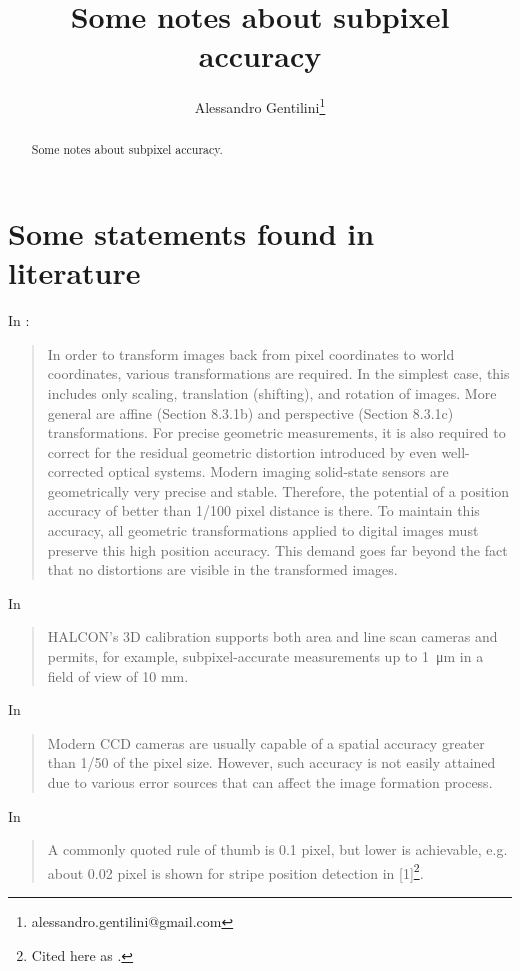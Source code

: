 \documentclass[a4paper,12pt]{article}
\title{Some notes about subpixel accuracy}
\author{Alessandro Gentilini\thanks{alessandro.gentilini@gmail.com}}
\begin{document}
\maketitle

\begin{abstract}
Some notes about subpixel accuracy.
\end{abstract} 

\section{Some statements found in literature}
In \cite[section 8.2, p.270]{Jahne:2004:PHI:983100}:
\begin{quotation}
In order to transform images back from pixel coordinates to world coordinates,
various transformations are required. In the simplest case, this
includes only scaling,
translation (shifting), and rotation of images. More general are
affine (Section 8.3.1b)
and perspective (Section 8.3.1c) transformations. For precise
geometric measurements,
it is also required to correct for the residual geometric distortion
introduced by even
well-corrected optical systems. Modern imaging solid-state sensors are
geometrically
very precise and stable. Therefore, the potential of a position
accuracy of better than
1/100 pixel distance is there. To maintain this accuracy, all
geometric transformations
applied to digital images must preserve this high position accuracy.
This demand goes
far beyond the fact that no distortions are visible in the transformed images.
\end{quotation}

In \cite{halcon}
\begin{quotation}
HALCON’s 3D calibration supports both area and line scan cameras and
permits, for example, subpixel-accurate measurements up to \SI{1}{\micro\metre} in a field of
view of 10 mm.
\end{quotation}

In \cite{Heikkila:2000:GCC:354167.354171}
\begin{quotation}
Modern CCD cameras are usually capable of a spatial accuracy greater than 1/50 of the pixel
size. However, such accuracy is not easily attained due to various error sources that can affect
the image formation process.
\end{quotation}

In \cite{Fisher}
\begin{quotation}
A commonly quoted rule of thumb is 0.1 pixel, but lower is achievable, e.g. about 0.02 pixel is shown for stripe position detection in [1]\footnote{Cited here as \cite{doi:10.1117/12.55947}.}.
\end{quotation}
\end{document}
